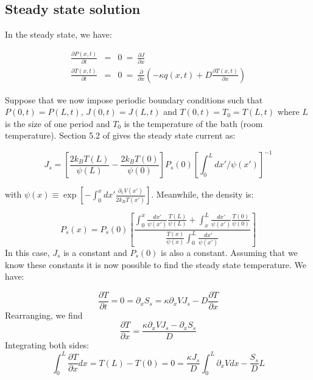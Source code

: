 \documentclass[11pt]{article} %
\begin{document}
\subsection{Steady state solution}
In the steady state, we have:

\begin{eqnarray}
\frac{\partial P(x, t)}{\partial t} &=&  0 \ = \ \frac{\partial J}{\partial x} \label{eqn:SmoluchowskiSteady} \\
\frac{\partial T(x, t)}{\partial t} &=& 0 \ = \ \frac{\partial}{\partial x} \left ( -\kappa q(x, t) + D \frac{\partial T(x, t)}{\partial x} \right ) \label{eqn:TemperatureSteady}
\end{eqnarray}

Suppose that we now impose periodic boundary conditions such that $P(0, t) = P(L, t)$,  $J(0, t) = J(L, t)$ and $T(0, t) = T_0 = T(L, t)$ where $L$ is the size of one period and $T_0$ is the temperature of the bath (room temperature). Section 5.2 of \cite{Gardiner2009} gives the steady state current as:

\begin{equation}
J_s = \left [\frac{2 k_B T(L)}{\psi(L)} - \frac{2 k_B T(0)}{\psi(0)}  \right] P_s(0) \left [\int_0^L dx'/\psi(x') \right]^{-1}
\label{eqn:SteadyCurrent}
\end{equation}

with $\psi(x) \equiv \exp[-\int_0^x dx' \frac{\partial_x V(x')}{2 k_B T(x')}]$. Meanwhile, the density is:

\begin{equation}
P_s(x) = P_s(0) \left [\frac{\int_0^x \frac{dx'}{\psi(x')} \frac{T(L)}{\psi(L)} + \int_x^L \frac{dx'}{\psi(x')} \frac{T(0)}{\psi(0)} }{\frac{T(x)}{\psi(x)} \int_0^L \frac{dx'}{\psi(x')} } \right]
\label{eqn:SteadyDensity}
\end{equation}
In this case, $J_s$ is a constant and $P_s(0)$ is also a constant. Assuming that we know these constants it is now possible to find the steady state temperature. We have:

\begin{equation}
\frac{\partial T}{\partial t} = 0 =  \partial_x S_s = \kappa \partial_x V J_s - D \frac{\partial T}{\partial x}
\end{equation}
Rearranging, we find
\begin{equation}
\frac{\partial T}{\partial x} = \frac{\kappa \partial_x V J_s - \partial_x S_s}{D}
\end{equation}
Integrating both sides:
\begin{equation}
\int_0^L \frac{\partial T}{\partial x} dx = T(L) - T(0) = 0 = \frac{\kappa J_s}{D} \int_0^L \partial_x V dx - \frac{S_s}{D}L
\end{equation}
\end{document}
